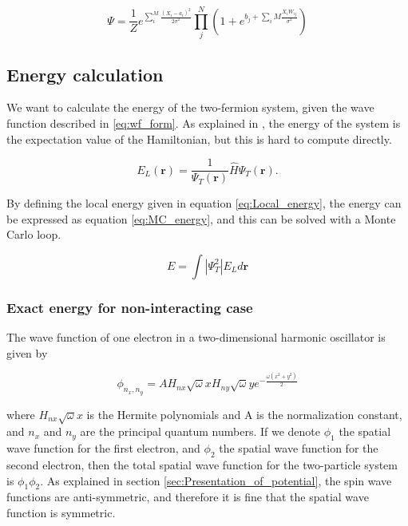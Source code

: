 \documentclass[norsk,a4paper,12pt]{article}
\begin{document}
\begin{equation}
\label{eq:wf_form}
	\Psi = \frac{1}{Z} e^{\sum_i^M \frac{(X_i - a_i)^2}{2\sigma^2}} \prod_j^N (1+ e^{b_j + \sum_iM \frac{X_i W_{ij}}{\sigma^2}})
\end{equation}

\subsection{Energy calculation}
We want to calculate the energy of the two-fermion system, given the wave function described in \ref{eq:wf_form}. As explained in \cite{Nordhagen}, the energy of the system is the expectation value of the Hamiltonian, but this is hard to compute directly. 

\begin{equation}
E_L(\boldsymbol{r})=\frac{1}{\Psi_T(\boldsymbol{r})}\hat{H}\Psi_T(\boldsymbol{r}).
\label{eq:Local_energy}
\end{equation}

By defining the local energy given in equation \ref{eq:Local_energy}, the energy can be expressed as equation \ref{eq:MC_energy}, and this can be solved with a Monte Carlo loop.

\begin{equation}
\label{eq:MC_energy}
E = \int | \Psi_T^2| E_L d\boldsymbol{r}
\end{equation}

\subsubsection{Exact energy for non-interacting case}

The wave function of one electron in a two-dimensional harmonic oscillator is given by

\begin{equation}
	\label{eq:one_e_wf_ho}
	\phi_{n_x, n_y} = A H_{nx} \sqrt{\omega} x H_{ny} \sqrt{\omega} y e^{-\frac{\omega(x^2 + y^2)}{2}}
\end{equation}

where $H_{nx} \sqrt{\omega} x$ is the Hermite polynomials and A is the normalization constant, and $n_x$ and $n_y$ are the principal quantum numbers. If we denote $\phi_1$ the spatial wave function for the first electron, and $\phi_2$ the spatial wave function for the second electron, then the total spatial wave function for the two-particle system is $\phi_1 \phi_2$. As explained in section \ref{sec:Presentation_of_potential}, the spin wave functions are anti-symmetric, and therefore it is fine that the spatial wave function is symmetric.
\end{document}
